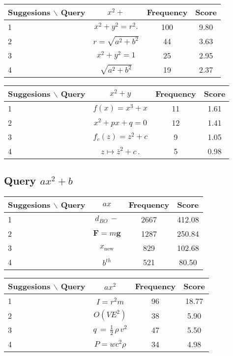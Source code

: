 \documentclass[12pt]{article} %
\begin{document}
\begin{center}
\begin{tabular}{lccc}
Suggesions $\backslash$ Query  & $x^2+ $ & Frequency & Score \\
\hline
 1 &  $ x^{2}+y^{2}=r^{2}.\! $ & 100 & 9.80 \\
 2 &  $ \scriptstyle r=\sqrt{a^{2}+b^{2}} $ & 44 & 3.63 \\
 3 &  $ x^{2}+y^{2}=1 $ & 25 & 2.95 \\
 4 &  $ \sqrt{a^{2}+b^{2}} $ & 19 & 2.37 \\
\end{tabular}
\end{center}


\begin{center}
\begin{tabular}{lccc}
Suggesions $\backslash$ Query  & $x^2 + y$ & Frequency & Score \\
\hline
 1 &  $ f(x)=x^{3}+x $ & 11 & 1.61 \\
 2 &  $ x^{2}+px+q=0 $ & 12 & 1.41 \\
 3 &  $ f_{c}(z)=z^{2}+c $ & 9 & 1.05 \\
 4 &  $ z\mapsto\bar{z}^{2}+c\,. $ & 5 & 0.98 \\
\end{tabular}
\end{center}

\pagebreak

\subsection{Query $ax^2+b$}

\begin{center}
\begin{tabular}{lccc}
Suggesions $\backslash$ Query  & $ ax $ & Frequency & Score \\
\hline
 1 &  $ d_{BO}\!\,- $ & 2667 & 412.08 \\
 2 &  $ \mathbf{F}=m\mathbf{g} $ & 1287 & 250.84 \\
 3 &  $ x_{\mathrm{new}} $ & 829 & 102.68 \\
 4 &  $ b^{th} $ & 521 & 80.50 \\
\end{tabular}
\end{center}

\begin{center}
\begin{tabular}{lccc}
Suggesions $\backslash$ Query  & $ ax^2 $ & Frequency & Score \\
\hline
 1 &  $ I=r^{2}m $ & 96 & 18.77 \\
 2 &  $ O(VE^{2}) $ & 38 & 5.90 \\
 3 &  $ q\,=\,\tfrac{1}{2}\,\rho\,v^{2} $ & 47 & 5.50 \\
 4 &  $ P=wc^{2}\rho $ & 34 & 4.98 \\
\end{tabular}
\end{center}
\end{document}
